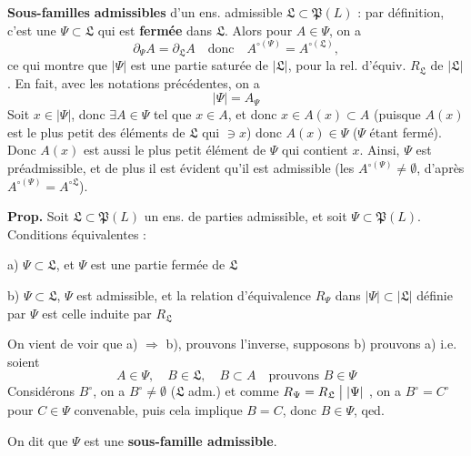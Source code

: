 \documentclass[11pt,a4paper]{article}
\begin{document}
\textbf{Sous-familles} \add{(\ill{})} \textbf{admissibles} d'un ens. admissible $\mathfrak{L} \subset \mathfrak{P}(L)$ : par définition, c'est une $\Psi \subset \mathfrak{L}$ qui est \textbf{fermée} dans $\mathfrak{L}$. Alors pour $A \in \Psi$, \struck{\ill{}} on a
\[
  \partial_{\Psi} A = \partial_{\mathfrak{L}} A \quad \text{donc} \quad A^{\circ (\Psi)} = A^{\circ (\mathfrak{L})} ,
\]
ce qui montre que $|\Psi|$ est une partie saturée de $|\mathfrak{L}|$, pour la rel. d'équiv. $R_{\mathfrak{L}}$ de $|\mathfrak{L}|$.  En fait, avec les notations précédentes, on a
\[
  |\Psi| = A_{\Psi}
\]
 Soit $x \in |\Psi|$, donc $\exists A \in \Psi$ tel que $x \in A$,  et donc $x \in A(x) \subset A$ (puisque $A(x)$ est le plus petit des éléments de $\mathfrak{L}$ qui $\ni x$) donc $A(x) \in \Psi$ ($\Psi$ étant fermé). Donc $A(x)$ est aussi le plus petit élément de $\Psi$ qui contient $x$. Ainsi, $\Psi$ est préadmissible, et de plus il est évident qu'il est admissible (les $A^{\circ(\Psi)} \neq \emptyset$, d'après $A^{\circ(\Psi)} = A^{\circ \mathfrak{L}}$).

\textbf{Prop.} Soit $\mathfrak{L} \subset \mathfrak{P}(L)$ un ens. de parties admissible, et soit $\Psi \subset \mathfrak{P}(L)$. Conditions équivalentes :

a) $\Psi \subset \mathfrak{L}$, et $\Psi$ est une partie fermée de $\mathfrak{L}$ 

b) $\Psi \subset \mathfrak{L}$, $\Psi$ est admissible, et la relation d'équivalence $R_{\Psi}$ dans $|\Psi| \subset |\mathfrak{L}|$ définie par $\Psi$ est celle induite par $R_{\mathfrak{L}}$

On vient de voir que a) $\Rightarrow$ b), prouvons l'inverse, supposons b) prouvons a) i.e. soient
\[
  A \in \Psi, \quad B \in \mathfrak{L}, \quad B \subset A \quad \text{prouvons } B \in \Psi
\]
Considérons $B^{\circ}$, on a $B^{\circ} \neq \emptyset$ ($\mathfrak{L}$ adm.) et comme $R_{\Psi} = R_{\mathfrak{L}} \bigm| |\Psi|$ , on a $B^{\circ} = C^{\circ}$ pour $C \in \Psi$ convenable, puis cela implique $B = C$, donc $B \in \Psi$, qed.

On dit que $\Psi$ est une \textbf{sous-famille admissible}. 
\end{document}
